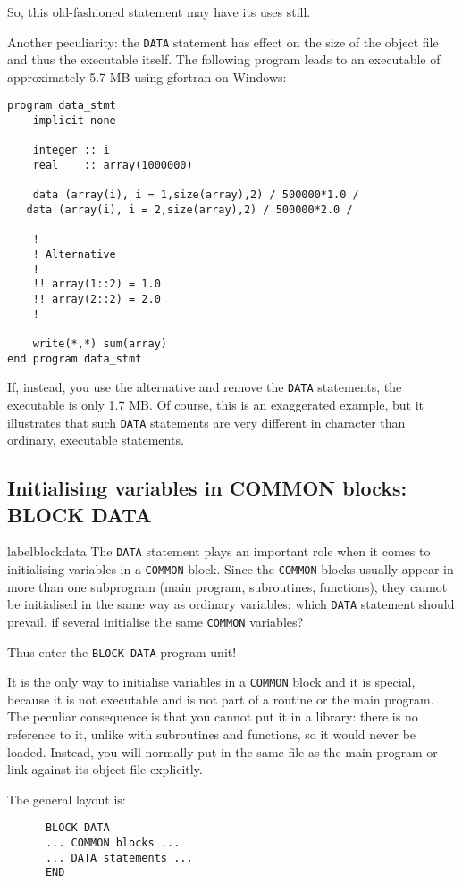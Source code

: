 So, this old-fashioned statement may have its uses still.

Another peculiarity: the \verb+DATA+ statement has effect on the
size of the object file and thus the executable itself. The following
program leads to an executable of approximately 5.7 MB using gfortran
on Windows:
\begin{verbatim}
program data_stmt
    implicit none

    integer :: i
    real    :: array(1000000)

    data (array(i), i = 1,size(array),2) / 500000*1.0 /
   data (array(i), i = 2,size(array),2) / 500000*2.0 /

    !
    ! Alternative
    !
    !! array(1::2) = 1.0
    !! array(2::2) = 2.0
    !

    write(*,*) sum(array)
end program data_stmt
\end{verbatim}

If, instead, you use the alternative and remove the \verb+DATA+
statements, the executable is only 1.7 MB. Of course, this is
an exaggerated example, but it illustrates that such \verb+DATA+
statements are very different in character than ordinary, executable
statements.


\subsection{Initialising variables in COMMON blocks: BLOCK DATA}
label{blockdata}
The \verb+DATA+ statement plays an important role when it comes to initialising
variables in a \verb+COMMON+ block. Since the \verb+COMMON+ blocks usually
appear in more than one subprogram (main program, subroutines, functions),
they cannot be initialised in the same way as ordinary variables: which
\verb+DATA+ statement should prevail, if several initialise the same
\verb+COMMON+ variables?

Thus enter the \verb+BLOCK DATA+ program unit!

It is the only way to initialise variables in a \verb+COMMON+ block and
it is special, because it is not executable and is not part of a routine
or the main program. The peculiar consequence is
that you cannot put it in a library: there is no reference to it, unlike
with subroutines and functions, so it would never be loaded. Instead, you
will normally put in the same file as the main program or link against
its object file explicitly.

The general layout is:
%
\begin{verbatim}
      BLOCK DATA
      ... COMMON blocks ...
      ... DATA statements ...
      END
\end{verbatim}

